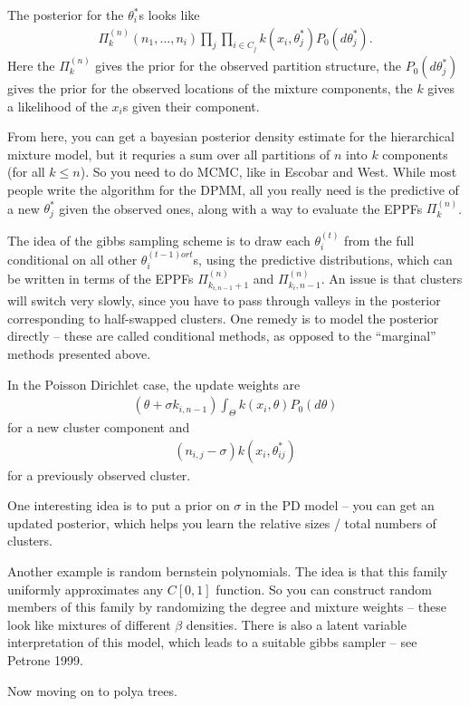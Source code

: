 \documentclass{article}
\begin{document}
The posterior for the $\theta_{i}^{\ast}$s looks like
\begin{align}
\Pi_{k}^{(n)}\left(n_{1}, \dots, n_{i}\right) \prod_{j} \prod_{i \in C_{j}} k\left(x_{i}, \theta_{j}^{\ast}\right) P_{0}\left(d\theta_{j}^{\ast}\right).
\end{align}
Here the $\Pi_{k}^{(n)}$ gives the prior for the observed partition structure,
the $P_{0}\left(d\theta_{j}^{\ast}\right)$ gives the prior for the observed
locations of the mixture components, the $k$ gives a likelihood of the $x_{i}$s
given their component.

From here, you can get a bayesian posterior density estimate for the
hierarchical mixture model, but it requries a sum over all partitions of $n$
into $k$ components (for all $k \leq n$). So you need to do MCMC, like in
Escobar and West. While most people write the algorithm for the DPMM, all you
really need is the predictive of a new $\theta_{j}^{\ast}$ given the observed
ones, along with a way to evaluate the EPPFs $\Pi_{k}^{(n)}$.

The idea of the gibbs sampling scheme is to draw each $\theta_{i}^{(t)}$ from
the full conditional on all other $\theta_{i}^{(t-1) or t}$s, using the
predictive distributions, which can be written in terms of the EPPFs
$\Pi_{k_{i, n - 1} + 1}^{(n)}$ and $\Pi_{k_{i}, n -1}^{(n)}$. An issue is that
clusters will switch very slowly, since you have to pass through valleys in the
posterior corresponding to half-swapped clusters. One remedy is to model the
posterior directly -- these are called conditional methods, as opposed to the
``marginal'' methods presented above.

In the Poisson Dirichlet case, the update weights are 
\begin{align}
\left(\theta + \sigma k_{i, n - 1}\right) \int_{\Theta}k\left(x_{i}, \theta\right)P_{0}\left(d\theta\right)
\end{align}
for a new cluster component and
\begin{align}
\left(n_{i, j} - \sigma\right)k\left(x_{i}, \theta_{ij}^{\ast}\right)
\end{align}
for a previously observed cluster.

One interesting idea is to put a prior on $\sigma$ in the PD model -- you can
get an updated posterior, which helps you learn the relative sizes / total
numbers of clusters.

Another example is random bernstein polynomials. The idea is that this family
uniformly approximates any $C\left[0, 1\right]$ function. So you can construct
random members of this family by randomizing the degree and mixture weights --
these look like mixtures of different $\beta$ densities. There is also a latent
variable interpretation of this model, which leads to a suitable gibbs sampler
-- see Petrone 1999.

Now moving on to polya trees.
\end{document}
